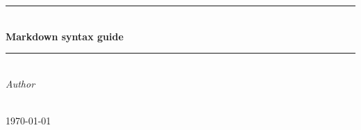 
\begin{titlepage}
  \newcommand{\HRule}{\rule{\linewidth}{0.5mm}}
  
  \clearpage

  \begin{center}
    \HRule\\[0.4cm]
    {\huge \bfseries Markdown syntax guide\\[0.4cm]}
    \HRule\\[1.5cm]

    \emph{Author}\\[0.1cm]
    \noindent{}\\[1cm]

    \vfill

    {\large \today}

  \end{center}
\end{titlepage}

